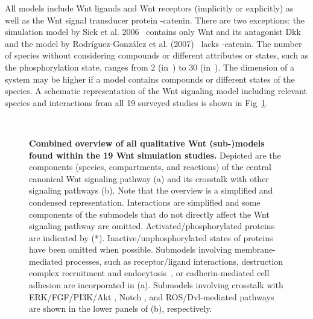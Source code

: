 \documentclass[10pt,letterpaper]{article}
\newcommand{\bcat}{\textbeta-catenin}
\newcommand{\wnt}{Wnt}
\begin{document}
All models include \wnt{} ligands and \wnt{} receptors (implicitly or explicitly) as well as the \wnt{} signal transducer protein \bcat{}.
There are two exceptions: the simulation model by Sick et al. 2006~\cite{Sick2006} contains only \wnt{} and its antagonist Dkk and the model by Rodríguez-González et al. (2007)~\cite{Rodriguez2007} lacks \bcat{}.
The number of species without considering compounds or different attributes or states, such as the phosphorylation state,  ranges from 2 (in~\cite{Sick2006}) to 30 (in~\cite{Padala2017}).
The dimension of a system may be higher if a model contains compounds or different states of the species.
A schematic representation of the \wnt{} signaling model including relevant species and interactions from all 19 surveyed studies is shown in Fig~\ref{fig:WNTmodel}.

\begin{figure}[!h]
\begin{adjustwidth}{-2.25in}{0in}
\centering
{}\\
\caption{{\bf Combined overview of all qualitative \wnt{} (sub-)models found within the 19 \wnt{} simulation studies.}
Depicted are the components (species, compartments, and reactions) of the central canonical \wnt{} signaling pathway (a) and its crosstalk with other signaling pathways (b).
Note that the overview is a simplified and condensed representation.
Interactions are simplified and some components of the submodels that do not directly affect the \wnt{} signaling pathway are omitted.
Activated/phosphorylated proteins are indicated by (*).
Inactive/unphosphorylated states of proteins have been omitted when possible.
Submodels involving membrane-mediated processes, such as receptor/ligand interactions, destruction complex recruitment and endocytosis~\cite{Sick2006, Kogan2012, Haack2015, Haack2020}, or cadherin-mediated cell adhesion \cite{vanLeeuwen2007, vanLeeuwen2009, Chen2014} are incorporated in (a).
Submodels involving crosstalk with ERK/FGF/PI3K/Akt \cite{Kim2007, Goldbeter2008, Padala2017}, Notch \cite{Rodriguez2007, Goldbeter2008, Wang2013}, and ROS/Dvl-mediated pathways \cite{Haack2015, Staehlke2020} are shown in the lower panels of (b), respectively.
}\label{fig:WNTmodel}
\end{adjustwidth}
\end{figure}


\end{document}
